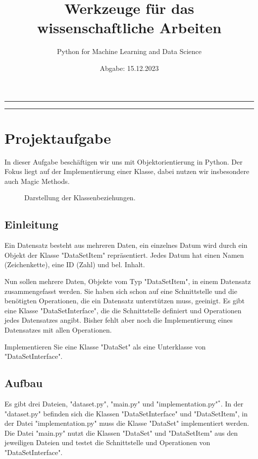 \documentclass[]{article}
\title{\bfseries \Large Werkzeuge für das wissenschaftliche Arbeiten}
\author{\normalsize Python for Machine Learning and Data Science}
\date{\normalsize Abgabe: 15.12.2023}
\begin{document}
\maketitle

\hrule
\vspace{0.2cm}

\tableofcontents

\hrule
\vspace{0.2cm}

\section{Projektaufgabe}
In dieser Aufgabe beschäftigen wir uns mit Objektorientierung in Python.
Der Fokus liegt auf der Implementierung einer Klasse, dabei nutzen wir insbesondere auch Magic Methods.

\begin{figure}[htbp]
  \centering
  
  \caption{\scriptsize Darstellung der Klassenbeziehungen.}
\end{figure}

\subsection{Einleitung}
Ein Datensatz besteht aus mehreren Daten, ein einzelnes Datum wird durch ein Objekt der Klasse "DataSetItem" repräsentiert.
Jedes Datum hat einen Namen (Zeichenkette), eine ID (Zahl) und bel. Inhalt.

Nun sollen mehrere Daten, Objekte vom Typ "DataSetItem", in einem Datensatz zusammengefasst werden.
Sie haben sich schon auf eine Schnittstelle und die benötigten Operationen, die ein Datensatz unterstützen muss, geeinigt.
Es gibt eine Klasse "DataSetInterface", die die Schnittstelle definiert und Operationen jedes Datensatzes angibt.
Bisher fehlt aber noch die Implementierung eines Datensatzes mit allen Operationen.

Implementieren Sie eine Klasse "DataSet" als eine Unterklasse von "DataSetInterface".

\subsection{Aufbau}
Es gibt drei Dateien, "dataset.py", "main.py" und "implementation.py"$^*$.
In der "dataset.py" befinden sich die Klassen "DataSetInterface" und "DataSetItem",
in der Datei "implementation.py" muss die Klasse "DataSet" implementiert werden.
Die Datei "main.py" nutzt die Klassen "DataSet" und "DataSetItem" aus den jeweiligen Dateien und testet die Schnittstelle und Operationen von "DataSetInterface".
\end{document}
